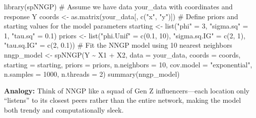\documentclass[
  11pt,
]{report}
\newenvironment{Shaded}{\begin{snugshade}}{\end{snugshade}}
\newcommand{\AttributeTok}[1]{\textcolor[rgb]{0.40,0.45,0.13}{#1}}
\newcommand{\CommentTok}[1]{\textcolor[rgb]{0.37,0.37,0.37}{#1}}
\newcommand{\DecValTok}[1]{\textcolor[rgb]{0.68,0.00,0.00}{#1}}
\newcommand{\FloatTok}[1]{\textcolor[rgb]{0.68,0.00,0.00}{#1}}
\newcommand{\FunctionTok}[1]{\textcolor[rgb]{0.28,0.35,0.67}{#1}}
\newcommand{\NormalTok}[1]{\textcolor[rgb]{0.00,0.23,0.31}{#1}}
\newcommand{\OtherTok}[1]{\textcolor[rgb]{0.00,0.23,0.31}{#1}}
\newcommand{\SpecialCharTok}[1]{\textcolor[rgb]{0.37,0.37,0.37}{#1}}
\newcommand{\StringTok}[1]{\textcolor[rgb]{0.13,0.47,0.30}{#1}}
\begin{document}
\begin{Shaded}
\begin{Highlighting}[]
\FunctionTok{library}\NormalTok{(spNNGP)}
\CommentTok{\# Assume we have data \textquotesingle{}your\_data\textquotesingle{} with coordinates and response \textquotesingle{}Y\textquotesingle{}}
\NormalTok{coords }\OtherTok{\textless{}{-}} \FunctionTok{as.matrix}\NormalTok{(your\_data[, }\FunctionTok{c}\NormalTok{(}\StringTok{"x"}\NormalTok{, }\StringTok{"y"}\NormalTok{)])}
\CommentTok{\# Define priors and starting values for the model parameters}
\NormalTok{starting }\OtherTok{\textless{}{-}} \FunctionTok{list}\NormalTok{(}\StringTok{"phi"} \OtherTok{=} \DecValTok{3}\NormalTok{, }\StringTok{"sigma.sq"} \OtherTok{=} \DecValTok{1}\NormalTok{, }\StringTok{"tau.sq"} \OtherTok{=} \FloatTok{0.1}\NormalTok{)}
\NormalTok{priors   }\OtherTok{\textless{}{-}} \FunctionTok{list}\NormalTok{(}\StringTok{"phi.Unif"} \OtherTok{=} \FunctionTok{c}\NormalTok{(}\FloatTok{0.1}\NormalTok{, }\DecValTok{10}\NormalTok{), }\StringTok{"sigma.sq.IG"} \OtherTok{=} \FunctionTok{c}\NormalTok{(}\DecValTok{2}\NormalTok{, }\DecValTok{1}\NormalTok{), }\StringTok{"tau.sq.IG"} \OtherTok{=} \FunctionTok{c}\NormalTok{(}\DecValTok{2}\NormalTok{, }\FloatTok{0.1}\NormalTok{))}
\CommentTok{\# Fit the NNGP model using 10 nearest neighbors}
\NormalTok{nngp\_model }\OtherTok{\textless{}{-}} \FunctionTok{spNNGP}\NormalTok{(Y }\SpecialCharTok{\textasciitilde{}}\NormalTok{ X1 }\SpecialCharTok{+}\NormalTok{ X2, }
                     \AttributeTok{data =}\NormalTok{ your\_data, }
                     \AttributeTok{coords =}\NormalTok{ coords,}
                     \AttributeTok{starting =}\NormalTok{ starting, }
                     \AttributeTok{priors =}\NormalTok{ priors, }
                     \AttributeTok{n.neighbors =} \DecValTok{10}\NormalTok{,}
                     \AttributeTok{cov.model =} \StringTok{"exponential"}\NormalTok{, }
                     \AttributeTok{n.samples =} \DecValTok{1000}\NormalTok{, }
                     \AttributeTok{n.threads =} \DecValTok{2}\NormalTok{)}
\FunctionTok{summary}\NormalTok{(nngp\_model)}
\end{Highlighting}
\end{Shaded}

\textbf{Analogy:} Think of NNGP like a squad of Gen Z influencers---each
location only ``listens'' to its closest peers rather than the entire
network, making the model both trendy and computationally sleek.
\end{document}
